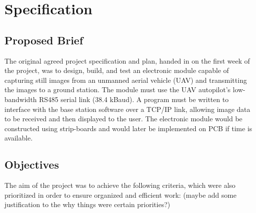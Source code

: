 \chapter{Specification}

\section{Proposed Brief}
The original agreed project specification and plan, handed in on the first week of the project, was to design, build, and test an electronic module capable of capturing still images from an unmanned aerial vehicle (UAV) and transmitting the images to a ground station. The module must use the UAV autopilot’s low-bandwidth RS485 serial link (38.4 kBaud). A program must be written to interface with the base station software over a TCP/IP link, allowing image data to be received and then displayed to the user. The electronic module would be constructed using strip-boards and would later be implemented on PCB if time is available.


\section{Objectives} 
The aim of the project was to achieve the following criteria, which were also prioritized in order to ensure organized and efficient work: (maybe add some justification to the why things were certain priorities?)


